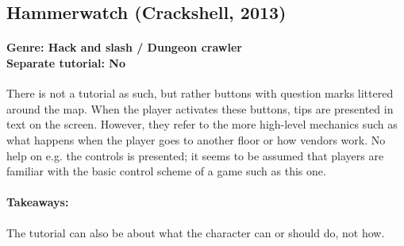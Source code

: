 \subsection{Hammerwatch (Crackshell, 2013)}
\paragraph{Genre: Hack and slash / Dungeon crawler \\ Separate tutorial: No \\}
There is not a tutorial as such, but rather buttons with question marks littered around the map. When the player activates these buttons, tips are presented in text on the screen. However, they refer to the more high-level mechanics such as what happens when the player goes to another floor or how vendors work. No help on e.g. the controls is presented; it seems to be assumed that players are familiar with the basic control scheme of a game such as this one.
\paragraph{Takeaways:}
The tutorial can also be about what the character can or should do, not how.




